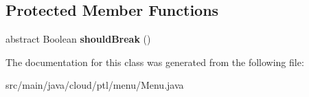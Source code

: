 \subsection*{Protected Member Functions}
\begin{DoxyCompactItemize}
\item 
\mbox{\label{classcloud_1_1ptl_1_1menu_1_1Menu_ad6022bbd37ee52964b2327b593902666}} 
abstract Boolean {\bfseries should\+Break} ()
\end{DoxyCompactItemize}


The documentation for this class was generated from the following file\+:\begin{DoxyCompactItemize}
\item 
src/main/java/cloud/ptl/menu/Menu.\+java\end{DoxyCompactItemize}
